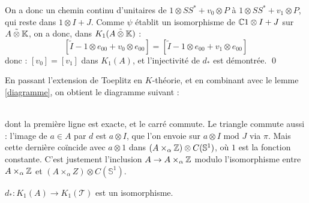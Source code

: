 \begin{dem}
On a donc un chemin continu d'unitaires de $1\otimes SS^*+v_0\otimes P$ à $1\otimes SS^*+v_1\otimes P$, qui reste dans $1\otimes I +J$. Comme $\psi$ établit un isomorphisme de $\mathbb C1\otimes I +J$ sur $\tilde{A\otimes \mathbb K}$, on a donc, dans $K_1(\tilde{A\otimes \mathbb K})$ :
\[[\tilde{I}-1\otimes e_{00}+v_0\otimes e_{00} ]=[ \tilde{I}-1\otimes e_{00}+v_1\otimes e_{00}]\]
donc : $[v_0]=[v_1]$ dans $K_1(A)$, et l'injectivité de $d_*$ est démontrée.
\qed\\
\end{dem}

En passant l'extension de Toeplitz en $K$-théorie, et en combinant avec le lemme \ref{diagramme}, on obtient le diagramme suivant :\\

\\

dont la première ligne est exacte, et le carré commute. Le triangle commute aussi : l'image de $a\in A$ par $d$ est $a\otimes I$, que l'on envoie sur $a\otimes I\text{ mod }J$ via $\pi$. Mais cette dernière coïncide avec $a\otimes 1$ dans $(A\times_\alpha \mathbb Z)\otimes C(\mathbb S^1)$, où $1$ est la fonction constante. C'est justement l'inclusion $A\rightarrow A\times_\alpha \mathbb Z$ modulo l'isomorphisme  entre $A\times_\alpha \mathbb Z$ et $(A\times_\alpha Z)\otimes C(\mathbb S^1)$. \\

\begin{lem}\label{isom} $d_* : K_1(A)\rightarrow K_1(\mathcal T)$ est un isomorphisme.\end{lem} 

